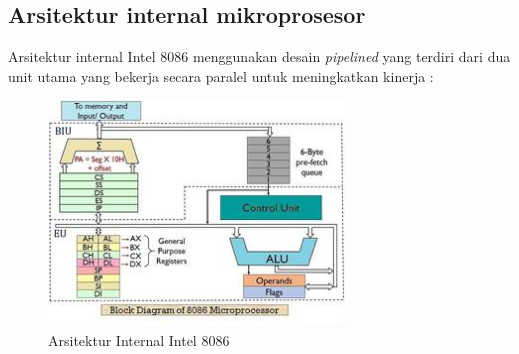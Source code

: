 \documentclass[../main.tex]{subfiles}
\begin{document}
    \subsection{Arsitektur internal mikroprosesor}
        Arsitektur internal Intel 8086 menggunakan desain \textit{pipelined} yang terdiri dari dua unit utama yang bekerja secara paralel untuk meningkatkan kinerja \cite{computer_organization_design}:

        \begin{figure}[H]
            \centering
            \includegraphics[width=0.7\textwidth]{../images/8086_architecture.jpg}
            \caption{Arsitektur Internal Intel 8086}
            \label{fig:8086-architecture}
        \end{figure}
\end{document}
